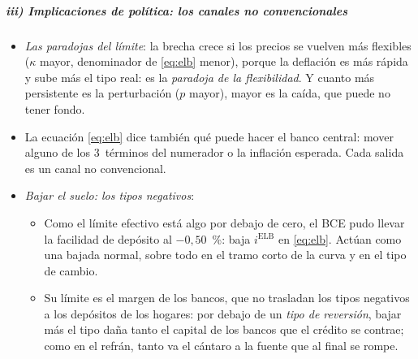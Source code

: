 \documentclass[11pt]{article}
\begin{document}
\subparagraph{iii) Implicaciones de política: los canales no convencionales}
\begin{itemize}
\item \emph{Las paradojas del límite}: la brecha crece si los precios se vuelven más flexibles ($\kappa$ mayor, denominador de \eqref{eq:elb} menor), porque la deflación es más rápida y sube más el tipo real: es la \emph{paradoja de la flexibilidad}\nocite{EggertssonKrugman2012}. Y cuanto más persistente es la perturbación ($p$ mayor), mayor es la caída, que puede no tener fondo.
\item La ecuación \eqref{eq:elb} dice también qué puede hacer el banco central: mover alguno de los 3~términos del numerador o la inflación esperada. Cada salida es un canal no convencional.
\end{itemize}

\begin{itemize}
\item \emph{Bajar el suelo: los tipos negativos}\label{sec:otros-instrumentos}:
  \begin{itemize}
\item Como el límite efectivo está algo por debajo de cero, el BCE pudo llevar la facilidad de depósito al $-0{,}50$~\%: baja $i^{\mathrm{ELB}}$ en \eqref{eq:elb}. Actúan como una bajada normal, sobre todo en el tramo corto de la curva y en el tipo de cambio.
\item Su límite es el margen de los bancos, que no trasladan los tipos negativos a los depósitos de los hogares: por debajo de un \emph{tipo de reversión}, bajar más el tipo daña tanto el capital de los bancos que el crédito se contrae\nocite{AbadiBrunnermeierKoby2023Reversal}; como en el refrán, tanto va el cántaro a la fuente que al final se rompe.
  \end{itemize}
\end{itemize}
\end{document}
